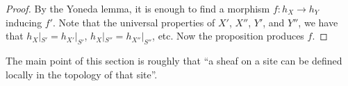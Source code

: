  \begin{proof}
   By the Yoneda lemma, it is enough to find a morphism $f:h_X\to h_Y$ inducing $f'$.
   Note that the universal properties of $X'$, $X''$, $Y'$, and $Y''$, we have that
   $h_X|_{S'}=h_{X'}|_{S'}$, $h_{X}|_{S''}=h_{X''}|_{S''}$, etc. Now the proposition
   produces $f$.
 \end{proof}

 The main point of this section is roughly that ``a sheaf on a site can be defined
 locally in the topology of that site''.

